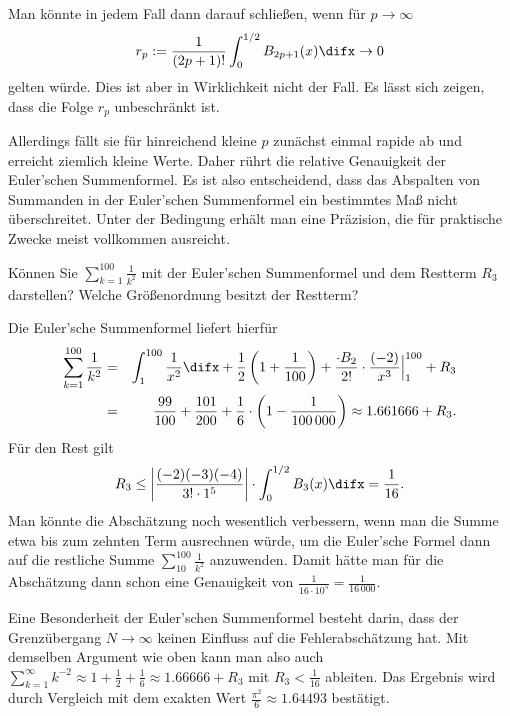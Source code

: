   \begin{antwort}
    Man könnte in jedem Fall dann darauf schließen, wenn für $p \to \infty$  
    \[
    r_p := \frac{1}{(2p+1)!} 
    \int_0^{1/2} B_{2p+1}(x) \difx \to 0
    \]
    gelten würde. Dies ist aber in Wirklichkeit nicht der Fall. 
    Es lässt sich zeigen, dass die Folge $r_p$ unbeschränkt ist. 

    Allerdings fällt sie für hinreichend kleine $p$ 
    zunächst einmal rapide ab und erreicht ziemlich kleine Werte. 
    Daher rührt die relative 
    Genauigkeit der Euler'schen Summenformel. Es ist also entscheidend, dass 
    das Abspalten von Summanden in der Euler'schen Summenformel ein bestimmtes 
    Maß nicht überschreitet. Unter der Bedingung erhält man eine Präzision, 
    die für praktische Zwecke meist vollkommen ausreicht. \AntEnd
  \end{antwort}

  \begin{frage}
    Können Sie $\sum_{k=1}^{100} \frac{1}{k^2}$ 
    mit der Euler'schen Summenformel und dem Restterm $R_3$ darstellen? 
    Welche Größenordnung besitzt der Restterm?
  \end{frage} 

  \begin{antwort}
    Die Euler'sche Summenformel liefert hierfür
    \begin{eqnarray*}
      \sum_{k=1}^{100} \frac{1}{k^2} &=& 
      \int_1^{100} \frac{1}{x^2} \difx + \frac{1}{2} 
      \left( 1+\frac{1}{100} \right) 
      + \frac{\cdot B_2}{2!}\cdot\frac{(-2)}{x^3}\Big|_1^{100}+ R_3 \\
      &=&
      \frac{99}{100} + \frac{101}{200} +
      \frac{1}{6}\cdot \left( 1- \frac{1}{100\,000} \right)
      \approx 1.661666 + R_3.
    \end{eqnarray*}
    Für den Rest gilt 
    \[
    R_3 \le \left| \frac{(-2)(-3)(-4)}{3! \cdot 1^5} \right| 
    \cdot\int_0^{1/2} B_3(x) \difx = \frac{1}{16}.
    \]
    Man könnte die Abschätzung noch wesentlich verbessern, 
    wenn man die Summe etwa bis zum zehnten Term ausrechnen 
    würde, um die Euler'sche Formel dann auf die restliche Summe 
    $\sum_{10}^{100} \frac{1}{k^2}$ anzuwenden. 
    Damit hätte man für die 
    Abschätzung dann schon eine Genauigkeit von 
    $\frac{1}{16\cdot 10^5}=\frac{1}{16\,000}$.

    Eine Besonderheit der Euler'schen Summenformel besteht darin, dass der 
    Grenzübergang $N\to \infty$ keinen Einfluss auf die Fehlerabschätzung hat. 
    Mit demselben Argument wie oben kann man also auch 
    $\sum_{k=1}^\infty k^{-2} \approx 1+\frac{1}{2}+\frac{1}{6} \approx 
    1.66666 + R_3$ mit $R_3 < \frac{1}{16}$ ableiten. Das Ergebnis 
    wird durch Vergleich mit dem exakten 
    Wert $\frac{\pi^2}{6} \approx 1.64493$ bestätigt.  
    \AntEnd
  \end{antwort}

